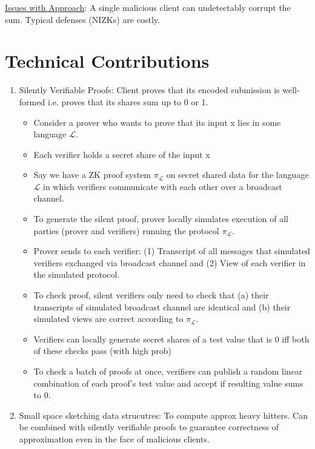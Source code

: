 \noindent \underline{Issues with Approach}: A single malicious client can undetectably corrupt the sum. Typical defenses (NIZKs) are costly.

\section{Technical Contributions}
\begin{enumerate}
    \item Silently Verifiable Proofs: Client proves that its encoded submission is well-formed i.e. proves that its shares sum up to 0 or 1.
    \begin{itemize}
        \item Consider a prover who wants to prove that its input x lies in some language $\mathcal{L}$.
        \item Each verifier holds a secret share of the input x
        \item Say we have a ZK proof system $\pi_{\mathcal{L}}$ on secret shared data for the language $\mathcal{L}$ in which verifiers communicate with each other over a broadcast channel.
        \item To generate the silent proof, prover locally simulates execution of all parties (prover and verifiers) running the protocol $\pi_{\mathcal{L}}$.
        \item Prover sends to each verifier: (1) Transcript of all messages that simulated verifiers exchanged via broadcast channel and (2) View of each verifier in the simulated protocol.
        \item To check proof, silent verifiers only need to check that (a) their transcripts of simulated broadcast channel are identical and (b) their simulated views are correct according to $\pi_\mathcal{L}$.
        \item Verifiers can locally generate secret shares of a test value that is 0 iff both of these checks pass (with high prob)
        \item To check a batch of proofs at once, verifiers can publish a random linear combination of each proof's test value and accept if resulting value sums to 0.
    \end{itemize}
    \item Small space sketching data strucutres: To compute approx heavy hitters. Can be combined with silently verifiable proofs to guarantee correctness of approximation even in the face of malicious clients.
\end{enumerate}

